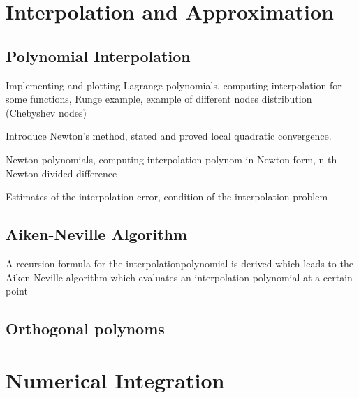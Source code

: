 \documentclass{article}
\theoremstyle{remark}
\begin{document}
\newpage
\section{Interpolation and Approximation}%
\label{sec:interpolation_and_approximation}

\subsection{Polynomial Interpolation}%
\label{sub:polynomial_interpolation}

\begin{tcolorbox}
  Implementing and plotting Lagrange polynomials, computing interpolation for some functions, Runge example, example of different nodes distribution (Chebyshev nodes)	
\end{tcolorbox}

\begin{tcolorbox}
   Introduce Newton's method, stated and proved local quadratic convergence. 	
\end{tcolorbox}

\begin{tcolorbox}
  Newton polynomials, computing interpolation polynom in Newton form, n-th Newton divided difference	
\end{tcolorbox}

\begin{tcolorbox}
  Estimates of the interpolation error, condition of the interpolation problem	
\end{tcolorbox}

\subsection{Aiken-Neville Algorithm}%
\label{sub:aiken_neville_algorithm}


\begin{tcolorbox}
  A recursion formula for the interpolationpolynomial is derived  which leads to the Aiken-Neville algorithm which evaluates an interpolation polynomial at a certain point	
\end{tcolorbox}


\subsection{Orthogonal polynoms}%
\label{sub:orthogonal_polynoms}

\newpage
\section{Numerical Integration}%
\label{sec:numerical_integration}
\end{document}
